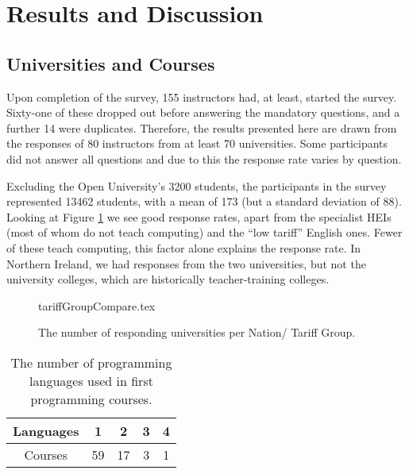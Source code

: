 \documentclass{sig-alternate}
\begin{document}
\section{Results and Discussion}\label{results}

\subsection{Universities and Courses}

Upon completion of the survey, 155 instructors had, at least, started
the survey. Sixty-one of these dropped out before answering the
mandatory questions, and a further 14 were duplicates. Therefore, the
results presented here are drawn from the responses of 80 instructors
from at least 70 universities. Some participants did not answer all
questions and due to this the response rate varies by question.

Excluding the Open University's 3200 students, the participants in the
survey represented 13462 students, with a mean of 173 (but a standard
deviation of 88). Looking at Figure \ref{fig:TG} we see good response
rates, apart from the specialist HEIs (most of whom do not teach
computing) and the ``low tariff'' English ones. Fewer of these teach
computing, %
this factor alone explains the response rate. In Northern Ireland, we
had responses from the two universities, but not the university
colleges, which are historically teacher-training colleges.

\begin{figure}
\begin{center}
{tariffGroupCompare.tex}\vskip-12pt
\caption{The number of responding universities per Nation/   
 Tariff Group.\label{fig:TG}}
\end{center}
\end{figure}

\begin{table}[]
\centering
\caption{The number of programming languages used in first programming courses.}
\label{tab:numLanguages}
\begin{tabular}{ccccc}
\hline
Languages & 1  & 2  & 3 & 4 \\ \hline
Courses   & 59 & 17 & 3 & 1 \\ \hline
\end{tabular}
\end{table}
\end{document}
